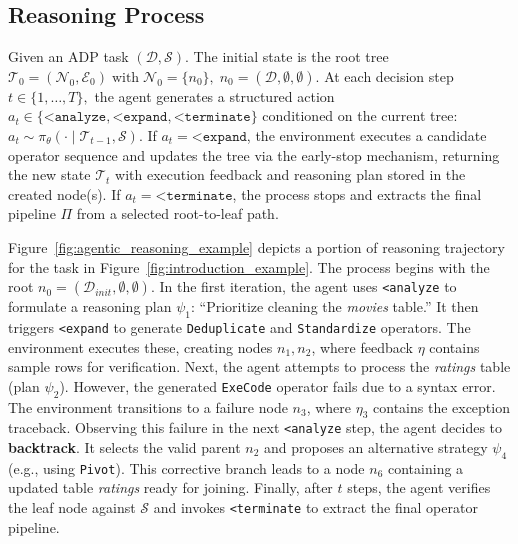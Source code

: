 \subsection{Reasoning Process}
\label{subsec:reasoning_algo}

Given an ADP task $(\mathcal{D}, \mathcal{S})$.
The initial state is the root tree $\mathcal{T}_0 = (\mathcal{N}_0, \mathcal{E}_0) \; \text{with} \; \mathcal{N}_0 = \{n_0\}, \; n_0 = (\mathcal{D}, \emptyset, \emptyset).$
At each decision step $t \in \{1,\dots,T\},$ the agent generates a structured action $a_t \in \{\texttt{<analyze}, \texttt{<expand}, \texttt{<terminate}\}$ conditioned on the current tree:
$
a_t \sim \pi_\theta(\cdot \mid \mathcal{T}_{t-1}, \mathcal{S}).
$
If $a_t = \texttt{<expand}$, the environment executes a candidate operator sequence and updates the tree via the early-stop mechanism, returning the new state $\mathcal{T}_t$ with execution feedback and reasoning plan stored in the created node(s).
If $a_t = \texttt{<terminate}$, the process stops and extracts the final pipeline $\Pi$ from a selected root-to-leaf path.

Figure~\ref{fig:agentic_reasoning_example} depicts a portion of reasoning trajectory for the task in Figure~\ref{fig:introduction_example}.
The process begins with the root $n_0=(\mathcal{D}_{init}, \emptyset, \emptyset)$.
In the first iteration, the agent uses \texttt{<analyze} to formulate a reasoning plan $\psi_1$: ``Prioritize cleaning the \textit{movies} table.'' It then triggers \texttt{<expand} to generate \texttt{Deduplicate} and \texttt{Standardize} operators. The environment executes these, creating nodes $n_1, n_2$, where feedback $\eta$ contains sample rows for verification.
Next, the agent attempts to process the \textit{ratings} table (plan $\psi_2$). However, the generated \texttt{ExeCode} operator fails due to a syntax error. The environment transitions to a failure node $n_3$, where $\eta_3$ contains the {exception traceback}.
Observing this failure in the next \texttt{<analyze} step, the agent decides to \textbf{backtrack}. It selects the valid parent $n_2$ and proposes an alternative strategy $\psi_4$ (e.g., using \texttt{Pivot}). This corrective branch leads to a node $n_6$ containing a updated table \textit{ratings} ready for joining. 
Finally, after $t$ steps, the agent verifies the leaf node against $\mathcal{S}$ and invokes \texttt{<terminate} to extract the final operator pipeline.

